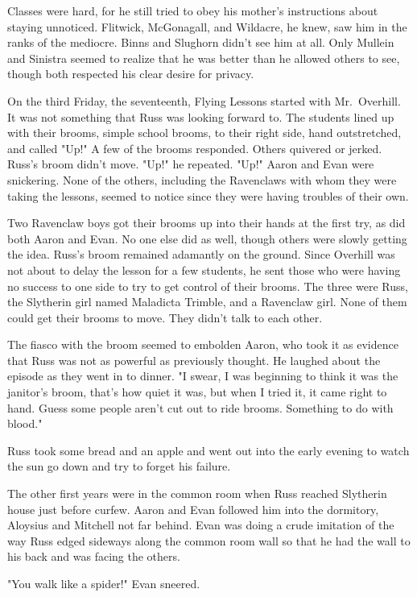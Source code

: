 Classes were hard, for he still tried to obey his mother's instructions about staying unnoticed. Flitwick, McGonagall, and Wildacre, he knew, saw him in the ranks of the mediocre. Binns and Slughorn didn't see him at all. Only Mullein and Sinistra seemed to realize that he was better than he allowed others to see, though both respected his clear desire for privacy.

On the third Friday, the seventeenth, Flying Lessons started with Mr.~Overhill. It was not something that Russ was looking forward to. The students lined up with their brooms, simple school brooms, to their right side, hand outstretched, and called "Up!" A few of the brooms responded. Others quivered or jerked. Russ's broom didn't move. "Up!" he repeated. "Up!" Aaron and Evan were snickering. None of the others, including the Ravenclaws with whom they were taking the lessons, seemed to notice since they were having troubles of their own.

Two Ravenclaw boys got their brooms up into their hands at the first try, as did both Aaron and Evan. No one else did as well, though others were slowly getting the idea. Russ's broom remained adamantly on the ground. Since Overhill was not about to delay the lesson for a few students, he sent those who were having no success to one side to try to get control of their brooms. The three were Russ, the Slytherin girl named Maladicta Trimble, and a Ravenclaw girl. None of them could get their brooms to move. They didn't talk to each other.

The fiasco with the broom seemed to embolden Aaron, who took it as evidence that Russ was not as powerful as previously thought. He laughed about the episode as they went in to dinner. "I swear, I was beginning to think it was the janitor's broom, that's how quiet it was, but when I tried it, it came right to hand. Guess some people aren't cut out to ride brooms. Something to do with blood."

Russ took some bread and an apple and went out into the early evening to watch the sun go down and try to forget his failure.

The other first years were in the common room when Russ reached Slytherin house just before curfew. Aaron and Evan followed him into the dormitory, Aloysius and Mitchell not far behind. Evan was doing a crude imitation of the way Russ edged sideways along the common room wall so that he had the wall to his back and was facing the others.

"You walk like a spider!" Evan sneered.

